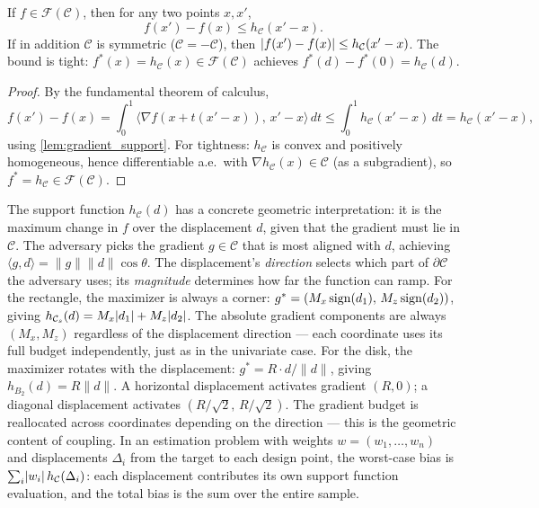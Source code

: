 \begin{lemma}\label{lem:lipschitz}
	If $f \in \mathcal{F}(\mathcal{C})$, then for any two points $x, x'$,
	\begin{equation}\label{eq:lipschitz_onesided}
		f(x') - f(x) \leq h_{\mathcal{C}}(x' - x).
	\end{equation}
	If in addition $\mathcal{C}$ is symmetric ($\mathcal{C} = -\mathcal{C}$), then $\lvert f(x') - f(x)\rvert \leq h_{\mathcal{C}}(x' - x)$.
	The bound is tight: $f^*(x) = h_{\mathcal{C}}(x) \in \mathcal{F}(\mathcal{C})$ achieves $f^*(d) - f^*(0) = h_{\mathcal{C}}(d)$.
\end{lemma}

\begin{proof}
	By the fundamental theorem of calculus,
	\begin{equation*}
		f(x') - f(x) = \int_0^1 \langle \nabla f(x + t(x'-x)),\, x' - x \rangle \, dt \leq \int_0^1 h_{\mathcal{C}}(x' - x) \, dt = h_{\mathcal{C}}(x' - x),
	\end{equation*}
	using \cref{lem:gradient_support}.
	For tightness: $h_{\mathcal{C}}$ is convex and positively homogeneous, hence differentiable a.e.\ with $\nabla h_{\mathcal{C}}(x) \in \mathcal{C}$ (as a subgradient), so $f^* = h_{\mathcal{C}} \in \mathcal{F}(\mathcal{C})$.
\end{proof}

The support function $h_{\mathcal{C}}(d)$ has a concrete geometric interpretation: it is the maximum change in $f$ over the displacement $d$, given that the gradient must lie in $\mathcal{C}$.
The adversary picks the gradient $g \in \mathcal{C}$ that is most aligned with $d$, achieving $\langle g, d \rangle = \|g\| \|d\| \cos\theta$.
The displacement's \emph{direction} selects which part of $\partial\mathcal{C}$ the adversary uses; its \emph{magnitude} determines how far the function can ramp.
For the rectangle, the maximizer is always a corner: $g^* = (M_x \operatorname{sign}(d_1),\, M_z \operatorname{sign}(d_2))$, giving $h_{\mathcal{C}_s}(d) = M_x\lvert d_1\rvert + M_z\lvert d_2\rvert$.
The absolute gradient components are always $(M_x, M_z)$ regardless of the displacement direction --- each coordinate uses its full budget independently, just as in the univariate case.
For the disk, the maximizer rotates with the displacement: $g^* = R \cdot d / \|d\|$, giving $h_{B_2}(d) = R\|d\|$.
A horizontal displacement activates gradient $(R, 0)$; a diagonal displacement activates $(R/\sqrt{2},\, R/\sqrt{2})$.
The gradient budget is reallocated across coordinates depending on the direction --- this is the geometric content of coupling.
In an estimation problem with weights $w = (w_1, \ldots, w_n)$ and displacements $\Delta_i$ from the target to each design point, the worst-case bias is $\sum_i \lvert w_i\rvert\, h_{\mathcal{C}}(\Delta_i)$: each displacement contributes its own support function evaluation, and the total bias is the sum over the entire sample.

